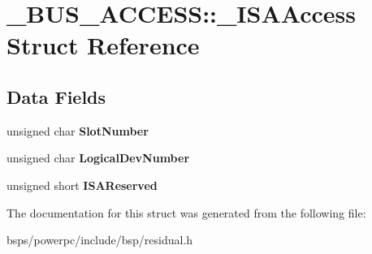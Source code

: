\hypertarget{struct__BUS__ACCESS_1_1__ISAAccess}{}\section{\+\_\+\+B\+U\+S\+\_\+\+A\+C\+C\+E\+SS\+::\+\_\+\+I\+S\+A\+Access Struct Reference}
\label{struct__BUS__ACCESS_1_1__ISAAccess}
\subsection*{Data Fields}
\begin{DoxyCompactItemize}
\item 
\mbox{\label{struct__BUS__ACCESS_1_1__ISAAccess_af16e9de690f2e04992f4c2837e5d0646}} 
unsigned char {\bfseries Slot\+Number}
\item 
\mbox{\label{struct__BUS__ACCESS_1_1__ISAAccess_a45d1ae38f5840d954932229a3e0cab91}} 
unsigned char {\bfseries Logical\+Dev\+Number}
\item 
\mbox{\label{struct__BUS__ACCESS_1_1__ISAAccess_a99bf1f208fef44d36fb569edd339425d}} 
unsigned short {\bfseries I\+S\+A\+Reserved}
\end{DoxyCompactItemize}


The documentation for this struct was generated from the following file\+:\begin{DoxyCompactItemize}
\item 
bsps/powerpc/include/bsp/residual.\+h\end{DoxyCompactItemize}
